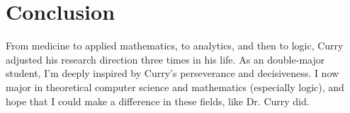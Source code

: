 \section{Conclusion}
From medicine to applied mathematics, to analytics, and then to logic, 
Curry adjusted his research direction three times in his life. 
As an double-major student, I'm deeply inspired by Curry's perseverance and decisiveness. 
I now major in theoretical computer science and mathematics (especially logic), 
and hope that I could make a difference in these fields, like Dr. Curry did.
